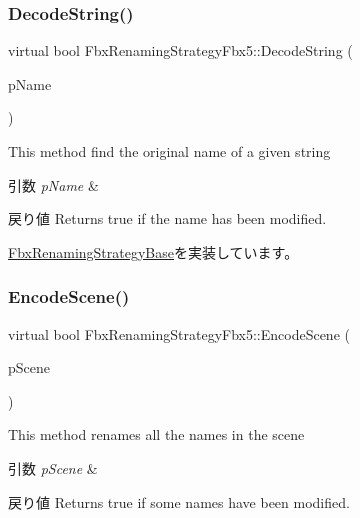 \subsubsection{\texorpdfstring{Decode\+String()}{DecodeString()}}
{\footnotesize\ttfamily virtual bool Fbx\+Renaming\+Strategy\+Fbx5\+::\+Decode\+String (\begin{DoxyParamCaption}\item[{\hyperlink{class_fbx_name_handler}{Fbx\+Name\+Handler} \&}]{p\+Name }\end{DoxyParamCaption})\hspace{0.3cm}{\ttfamily [virtual]}}

This method find the original name of a given string 
\begin{DoxyParams}{引数}
{\em p\+Name} & \\
\hline
\end{DoxyParams}
\begin{DoxyReturn}{戻り値}
Returns true if the name has been modified. 
\end{DoxyReturn}


\hyperlink{class_fbx_renaming_strategy_base_acc30037744da35fa2b59fdd4ff6d9ede}{Fbx\+Renaming\+Strategy\+Base}を実装しています。

\mbox{\label{class_fbx_renaming_strategy_fbx5_a559a5b6e57b4ac39b09aaa13fa021ab9}} 
\subsubsection{\texorpdfstring{Encode\+Scene()}{EncodeScene()}}
{\footnotesize\ttfamily virtual bool Fbx\+Renaming\+Strategy\+Fbx5\+::\+Encode\+Scene (\begin{DoxyParamCaption}\item[{\hyperlink{class_fbx_scene}{Fbx\+Scene} $\ast$}]{p\+Scene }\end{DoxyParamCaption})\hspace{0.3cm}{\ttfamily [virtual]}}

This method renames all the names in the scene 
\begin{DoxyParams}{引数}
{\em p\+Scene} & \\
\hline
\end{DoxyParams}
\begin{DoxyReturn}{戻り値}
Returns true if some names have been modified. 
\end{DoxyReturn}


